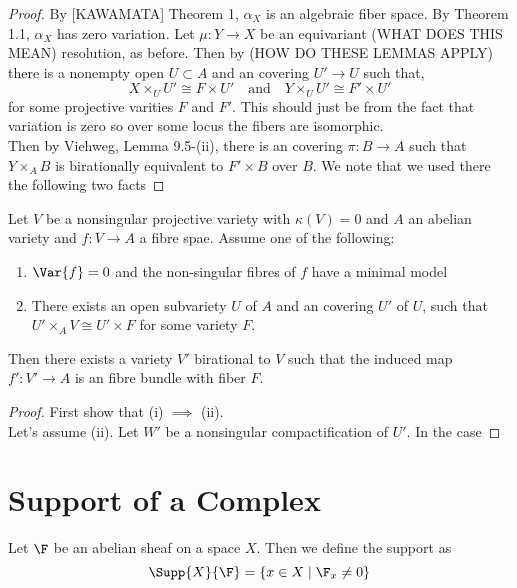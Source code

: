 \documentclass[12pt]{article}
\begin{document}
\begin{proof}
By [KAWAMATA] Theorem 1, $\alpha_X$ is an algebraic fiber space. By Theorem 1.1, $\alpha_X$ has zero variation. Let $\mu : Y \to X$ be an equivariant (WHAT DOES THIS MEAN) resolution, as before. Then by (HOW DO THESE LEMMAS APPLY) there is a nonempty open $U \subset A$ and an \etale covering $U' \to U$ such that,
\[ X \times_U U' \cong F \times U' \quad \text{and} \quad Y \times_U U' \cong F' \times U' \]
for some projective varities $F$ and $F'$. This should just be from the fact that variation is zero so over some locus the fibers are isomorphic. 
\bigskip\\
Then by Viehweg, Lemma 9.5-(ii), there is an \etale covering $\pi : B \to A$ such that $Y \times_A B$ is birationally equivalent to $F' \times B$ over $B$. We note that we used there the following two facts
\end{proof}

\begin{lemma}
Let $V$ be a nonsingular projective variety with $\kappa(V) = 0$ and $A$ an abelian variety and $f : V \to A$ a fibre spae. Assume one of the following:
\begin{enumerate}
\item $\Var{f} = 0$ and the non-singular fibres of $f$ have a minimal model
\item There exists an open subvariety $U$ of $A$ and an \etale covering $U'$ of $U$, such that $U' \times_A V \cong U' \times F$ for some variety $F$.
\end{enumerate}
Then there exists a variety $V'$ birational to $V$ such that the induced map $f' : V' \to A$ is an \etale fibre bundle with fiber $F$.
\end{lemma}

\begin{proof}
First show that (i) $\implies$ (ii).
\bigskip\\
Let's assume (ii). Let $W'$ be a nonsingular compactification of $U'$. In the case
\end{proof}


\section{Support of a Complex}

\begin{defn}
Let $\F$ be an abelian sheaf on a space $X$. Then we define the support as
\[ \Supp{X}{\F} = \{ x \in X \mid \F_x \neq 0 \} \]
\end{defn}
\end{document}
